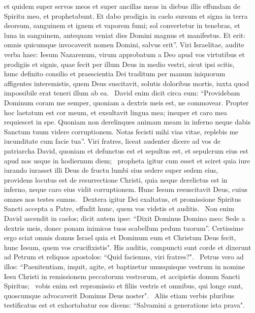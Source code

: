 \begin{biblechapter}
\verse et quidem super servos meos et super ancillas meas in diebus illis effundam de Spiritu meo, et prophetabunt. 
\verse Et dabo prodigia in caelo sursum et signa in terra deorsum, sanguinem et ignem et vaporem fumi; 
\verse sol convertetur in tenebras, et luna in sanguinem, antequam veniat dies Domini magnus et manifestus. 
\verse Et erit: omnis quicumque invocaverit nomen Domini, salvus erit”. 
\verse Viri Israelitae, audite verba haec: Iesum Nazarenum, virum approbatum a Deo apud vos virtutibus et prodigiis et signis, quae fecit per illum Deus in medio vestri, sicut ipsi scitis,  
\verse hunc definito consilio et praescientia Dei traditum per manum iniquorum affigentes interemistis,
\verse quem Deus suscitavit, solutis doloribus mortis, iuxta quod impossibile erat teneri illum ab ea.  
\verse David enim dicit circa eum: “Providebam Dominum coram me semper, quoniam a dextris meis est, ne commovear. 
\verse Propter hoc laetatum est cor meum, et exsultavit lingua mea; insuper et caro mea requiescet in spe. 
\verse Quoniam non derelinques animam meam in inferno neque dabis Sanctum tuum videre corruptionem. 
\verse Notas fecisti mihi vias vitae, replebis me iucunditate cum facie tua”. 
\verse Viri fratres, liceat audenter dicere ad vos de patriarcha David, quoniam et defunctus est et sepultus est, et sepulcrum eius est apud nos usque in hodiernum diem;  
\verse propheta igitur cum esset et sciret quia iure iurando iurasset illi Deus de fructu lumbi eius sedere super sedem eius,  
\verse providens locutus est de resurrectione Christi, quia neque derelictus est in inferno, neque caro eius vidit corruptionem. 
\verse Hunc Iesum resuscitavit Deus, cuius omnes nos testes sumus.  
\verse Dextera igitur Dei exaltatus, et promissione Spiritus Sancti accepta a Patre, effudit hunc, quem vos videtis et auditis.  
\verse Non enim David ascendit in caelos; dicit autem ipse: “Dixit Dominus Domino meo: Sede a dextris meis, 
\verse donec ponam inimicos tuos scabellum pedum tuorum”. 
\verse Certissime ergo sciat omnis domus Israel quia et Dominum eum et Christum Deus fecit, hunc Iesum, quem vos crucifixistis". 
\verse His auditis, compuncti sunt corde et dixerunt ad Petrum et reliquos apostolos: “Quid faciemus, viri fratres?".  
\verse Petrus vero ad illos: “Paenitentiam, inquit, agite, et baptizetur unusquisque vestrum in nomine Iesu Christi in remissionem peccatorum vestrorum, et accipietis donum Sancti Spiritus;  
\verse vobis enim est repromissio et filiis vestris et omnibus, qui longe sunt, quoscumque advocaverit Dominus Deus noster".  
\verse Aliis etiam verbis pluribus testificatus est et exhortabatur eos dicens: “Salvamini a generatione ista prava".  

\end{biblechapter}
